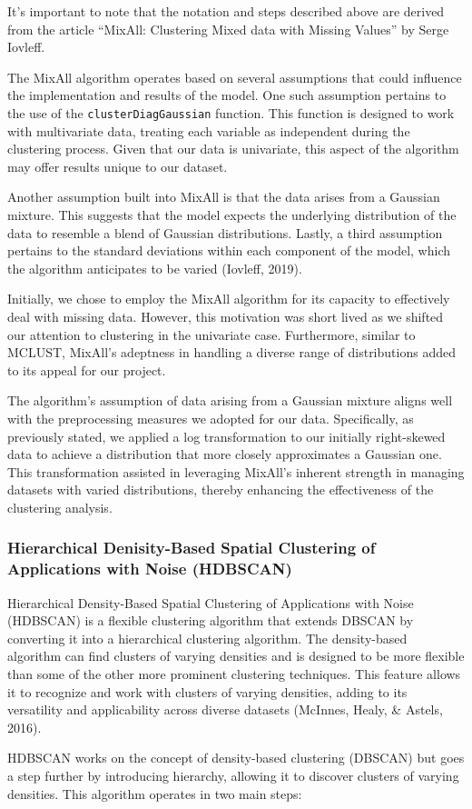 \documentclass[11pt, a4paper]{article}
\begin{document}
It's important to note that the notation and steps described above are derived from the article ``MixAll: Clustering Mixed data with Missing Values'' by Serge Iovleff.
\par
The MixAll algorithm operates based on several assumptions that could influence the implementation and results of the model. One such assumption pertains to the use of the \texttt{clusterDiagGaussian} function. This function is designed to work with multivariate data, treating each variable as independent during the clustering process. Given that our data is univariate, this aspect of the algorithm may offer results unique to our dataset.
\par
Another assumption built into MixAll is that the data arises from a Gaussian mixture. This suggests that the model expects the underlying distribution of the data to resemble a blend of Gaussian distributions. Lastly, a third assumption pertains to the standard deviations within each component of the model, which the algorithm anticipates to be varied  (Iovleff, 2019).
\par
Initially, we chose to employ the MixAll algorithm for its capacity to effectively deal with missing data. However, this motivation was short lived as we shifted our attention to clustering in the univariate case. Furthermore, similar to MCLUST, MixAll's adeptness in handling a diverse range of distributions added to its appeal for our project.
\par
The algorithm's assumption of data arising from a Gaussian mixture aligns well with the preprocessing measures we adopted for our data. Specifically, as previously stated, we applied a log transformation to our initially right-skewed data to achieve a distribution that more closely approximates a Gaussian one. This transformation assisted in leveraging MixAll's inherent strength in managing datasets with varied distributions, thereby enhancing the effectiveness of the clustering analysis.






\subsubsection{Hierarchical Denisity-Based Spatial Clustering of Applications with Noise (HDBSCAN)}


Hierarchical Density-Based Spatial Clustering of Applications with  Noise  (HDBSCAN)  is  a flexible clustering algorithm that extends DBSCAN by converting it into a hierarchical clustering algorithm. The density-based algorithm can find clusters of varying densities and is designed to be more flexible than some of the other more prominent clustering techniques. This feature allows it to recognize and work with clusters of varying densities, adding to its versatility and applicability across diverse datasets (McInnes, Healy, \& Astels, 2016).
\par
HDBSCAN works on the concept of density-based clustering (DBSCAN) but goes a step further by introducing hierarchy, allowing it to discover clusters of varying densities. This algorithm operates in two main steps:
\end{document}
